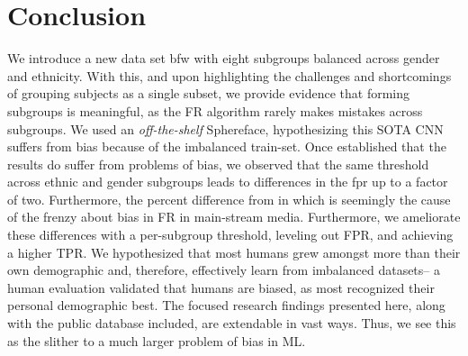 \documentclass[10pt,twocolumn,letterpaper]{article}
\begin{document}
\section{Conclusion}
We introduce a new data set \gls{bfw} with eight subgroups balanced across gender and ethnicity. With this, and upon highlighting the challenges and shortcomings of grouping subjects as a single subset, we provide evidence that forming subgroups is meaningful, as the FR algorithm rarely makes mistakes across subgroups. We used an \textit{off-the-shelf} Sphereface, hypothesizing this SOTA CNN suffers from bias because of the imbalanced train-set. Once established that the results do suffer from problems of bias, we observed that the same threshold across ethnic and gender subgroups leads to differences in the \gls{fpr} up to a factor of two. Furthermore, the percent difference from in which is seemingly the cause of the frenzy about bias in FR in main-stream media. Furthermore, we ameliorate these differences with a per-subgroup threshold, leveling out FPR, and achieving a higher TPR. We hypothesized that most humans grew amongst more than their own demographic and, therefore, effectively learn from imbalanced datasets-- a human evaluation validated that humans are biased, as most recognized their personal demographic best. The focused research findings presented here, along with the public database included, are extendable in vast ways. Thus, we see this as the slither to a much larger problem of bias in ML.



{\small


}


\end{document}
